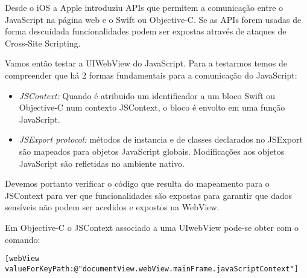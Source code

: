 Desde o iOS a Apple introduziu APIs que permitem a comunicação entre o JavaScript na página web e o Swift ou Objective-C.
Se as APIs forem usadas de forma descuidada funcionalidades podem ser expostas através de ataques de Cross-Site Scripting.\par

Vamos então testar a UIWebView do JavaScript. Para a testarmos temos de compreender que há 2 formas fundamentais para a comunicação do JavaScript:
\begin{itemize}
	\item\textit{JSContext:} Quando é atribuido um identificador a um bloco Swift ou Objective-C num contexto JSContext, o bloco é envolto em uma função JavaScript.  \par
\hfill\par

	\item\textit{JSExport protocol:} métodos de instancia e de classes declarados no JSExport são mapeados para objetos JavaScript globais. Modificações aos objetos JavaScript são refletidas no ambiente nativo. \par
\hfill\par
\end{itemize}

Devemos portanto verificar o código que resulta do mapeamento para o JSContext para ver que funcionalidades são expostas para garantir que dados sensíveis não podem ser acedidos e expostos na WebView. \par
\hfill\par
Em Objective-C o JSContext associado a uma 	UIwebView pode-se obter com o comando:
\begin{lstlisting}[basicstyle=\small,]
[webView valueForKeyPath:@"documentView.webView.mainFrame.javaScriptContext"]
\end{lstlisting}


